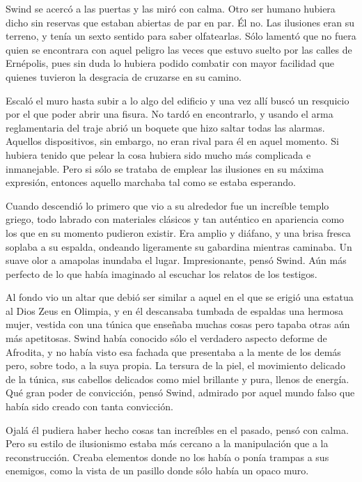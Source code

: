 Swind se acercó a las puertas y las miró con calma. Otro ser humano hubiera dicho sin reservas que estaban abiertas de par en par. Él no. Las ilusiones eran su terreno, y tenía un sexto sentido para saber olfatearlas. Sólo lamentó que no fuera quien se encontrara con aquel peligro las veces que estuvo suelto por las calles de Ernépolis, pues sin duda lo hubiera podido combatir con mayor facilidad que quienes tuvieron la desgracia de cruzarse en su camino.

Escaló el muro hasta subir a lo algo del edificio y una vez allí buscó un resquicio por el que poder abrir una fisura. No tardó en encontrarlo, y usando el arma reglamentaria del traje abrió un boquete que hizo saltar todas las alarmas. Aquellos dispositivos, sin embargo, no eran rival para él en aquel momento. Si hubiera tenido que pelear la cosa hubiera sido mucho más complicada e inmanejable. Pero si sólo se trataba de emplear las ilusiones en su máxima expresión, entonces aquello marchaba tal como se estaba esperando.

Cuando descendió lo primero que vio a su alrededor fue un increíble templo griego, todo labrado con materiales clásicos y tan auténtico en apariencia como los que en su momento pudieron existir. Era amplio y diáfano, y una brisa fresca soplaba a su espalda, ondeando ligeramente su gabardina mientras caminaba. Un suave olor a amapolas inundaba el lugar. Impresionante, pensó Swind. Aún más perfecto de lo que había imaginado al escuchar los relatos de los testigos.

Al fondo vio un altar que debió ser similar a aquel en el que se erigió una estatua al Dios Zeus en Olimpia, y en él descansaba tumbada de espaldas una hermosa mujer, vestida con una túnica que enseñaba muchas cosas pero tapaba otras aún más apetitosas. Swind había conocido sólo el verdadero aspecto deforme de Afrodita, y no había visto esa fachada que presentaba a la mente de los demás pero, sobre todo, a la suya propia. La tersura de la piel, el movimiento delicado de la túnica, sus cabellos delicados como miel brillante y pura, llenos de energía. Qué gran poder de convicción, pensó Swind, admirado por aquel mundo falso que había sido creado con tanta convicción.

Ojalá él pudiera haber hecho cosas tan increíbles en el pasado, pensó con calma. Pero su estilo de ilusionismo estaba más cercano a la manipulación que a la reconstrucción. Creaba elementos donde no los había o ponía trampas a sus enemigos, como la vista de un pasillo donde sólo había un opaco muro.

